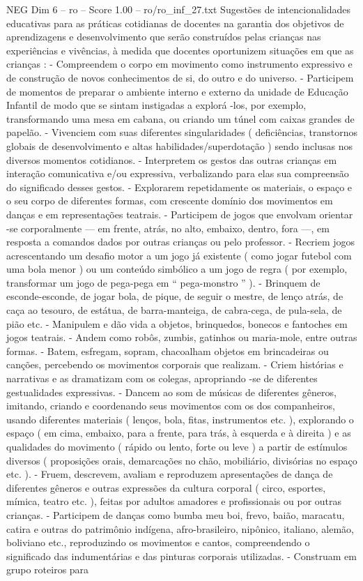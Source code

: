 \begin{textsample}{NEG Dim 6 – ro – Score 1.00 – ro/ro\_inf\_27.txt}  \label{ex:f6_neg_158}
Sugestões de intencionalidades educativas para as práticas cotidianas de docentes na garantia dos objetivos de aprendizagens e desenvolvimento que serão construídos pelas crianças nas experiências e vivências, à medida que docentes oportunizem situações em que as crianças : - Compreendem o corpo em movimento como instrumento expressivo e de construção de novos conhecimentos de si, do outro e do universo. - Participem de momentos de preparar o ambiente interno e externo da unidade de Educação Infantil de modo que se sintam instigadas a explorá -los, por exemplo, transformando uma mesa em cabana, ou criando um túnel com caixas grandes de papelão. - Vivenciem com suas diferentes singularidades ( deficiências, transtornos globais de desenvolvimento e altas habilidades/superdotação ) sendo inclusas nos diversos momentos cotidianos. - Interpretem os gestos das outras crianças em interação comunicativa e/ou expressiva, verbalizando para elas sua compreensão do significado desses gestos. - Explorarem repetidamente os materiais, o espaço e o seu corpo de diferentes formas, com crescente domínio dos movimentos em danças e em representações teatrais. - Participem de jogos que envolvam orientar -se corporalmente — em frente, atrás, no alto, embaixo, dentro, fora —, em resposta a comandos dados por outras crianças ou pelo professor. - Recriem jogos acrescentando um desafio motor a um jogo já existente ( como jogar futebol com uma bola menor ) ou um conteúdo simbólico a um jogo de regra ( por exemplo, transformar um jogo de pega-pega em “ pega-monstro ” ). - Brinquem de esconde-esconde, de jogar bola, de pique, de seguir o mestre, de lenço atrás, de caça ao tesouro, de estátua, de barra-manteiga, de cabra-cega, de pula-sela, de pião etc. - Manipulem e dão vida a objetos, brinquedos, bonecos e fantoches em jogos teatrais. - Andem como robôs, zumbis, gatinhos ou maria-mole, entre outras formas. - Batem, esfregam, sopram, chacoalham objetos em brincadeiras ou canções, percebendo os movimentos corporais que realizam. - Criem histórias e narrativas e as dramatizam com os colegas, apropriando -se de diferentes gestualidades expressivas. - Dancem ao som de músicas de diferentes gêneros, imitando, criando e coordenando seus movimentos com os dos companheiros, usando diferentes materiais ( lenços, bola, fitas, instrumentos etc. ), explorando o espaço ( em cima, embaixo, para a frente, para trás, à esquerda e à direita ) e as qualidades do movimento ( rápido ou lento, forte ou leve ) a partir de estímulos diversos ( proposições orais, demarcações no chão, mobiliário, divisórias no espaço etc. ). - Fruem, descrevem, avaliam e reproduzem apresentações de dança de diferentes gêneros e outras expressões da cultura corporal ( circo, esportes, mímica, teatro etc. ), feitas por adultos amadores e profissionais ou por outras crianças. - Participem de danças como bumba meu boi, frevo, baião, maracatu, catira e outras do patrimônio indígena, afro-brasileiro, nipônico, italiano, alemão, boliviano etc., reproduzindo os movimentos e cantos, compreendendo o significado das indumentárias e das pinturas corporais utilizadas. - Construam em grupo roteiros para 
\end{textsample}

